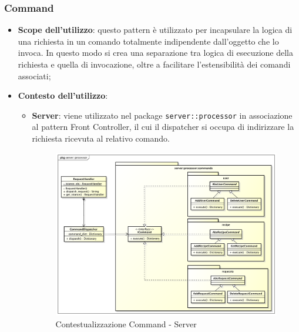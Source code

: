 	\subsubsection{Command} %
	\label{ssub:command}
		\begin{itemize}
			\item \textbf{Scope dell'utilizzo}: questo pattern è utilizzato per incapsulare la logica di una richiesta in un comando totalmente indipendente dall'oggetto che lo invoca. In questo modo si crea una separazione tra logica di esecuzione della richiesta e quella di invocazione, oltre a facilitare l'estensibilità dei comandi associati;
			\item \textbf{Contesto dell'utilizzo}:
				\begin{itemize}
					\item \textbf{Server}: viene utilizzato nel package \texttt{server::processor} in associazione al pattern Front Controller, il cui il dispatcher si occupa di indirizzare la richiesta ricevuta al relativo comando. \newline
					\begin{figure}[!htbp]
						\centering
						\centerline{\includegraphics[scale=0.35]{./images/design_pattern_server/dp_command.pdf}}
						\caption{Contestualizzazione Command - Server}
					\end{figure}
				\end{itemize}
		\end{itemize}


